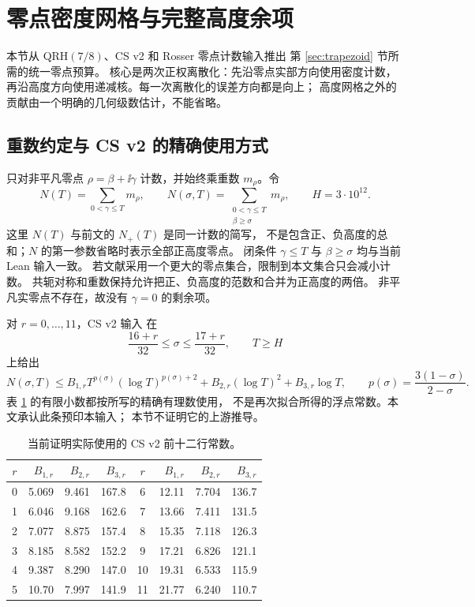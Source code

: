 \section{零点密度网格与完整高度余项}\label{sec:density}

本节从 QRH$(7/8)$、CS v2 和 Rosser 零点计数输入推出
第 \ref{sec:trapezoid} 节所需的统一零点预算。
核心是两次正权离散化：先沿零点实部方向使用密度计数，
再沿高度方向使用递减核。每一次离散化的误差方向都是向上；
高度网格之外的贡献由一个明确的几何级数估计，不能省略。

\subsection{重数约定与 CS v2 的精确使用方式}

只对非平凡零点 $\rho=\beta+\ii\gamma$ 计数，并始终乘重数
$m_\rho$。令
\[
 N(T)=\sum_{0<\gamma\leq T}m_\rho,\qquad
 N(\sigma,T)=\sum_{\substack{0<\gamma\leq T\\\beta\geq\sigma}}m_\rho,
 \qquad H=3\cdot10^{12}.
\]
这里 $N(T)$ 与前文的 $N_+(T)$ 是同一计数的简写，
不是包含正、负高度的总和；$N$ 的第一参数省略时表示全部正高度零点。
闭条件 $\gamma\leq T$ 与 $\beta\geq\sigma$ 均与当前 Lean 输入一致。
若文献采用一个更大的零点集合，限制到本文集合只会减小计数。
共轭对称和重数保持允许把正、负高度的范数和合并为正高度的两倍。
非平凡实零点不存在，故没有 $\gamma=0$ 的剩余项。

对 $r=0,\ldots,11$，CS v2 输入 \cite{CSv2} 在
\[
 \frac{16+r}{32}\leq\sigma\leq\frac{17+r}{32},\qquad T\geq H
\]
上给出
\begin{equation}\label{dens:CS}
 N(\sigma,T)\leq
 B_{1,r}T^{p(\sigma)}(\log T)^{p(\sigma)+2}
 +B_{2,r}(\log T)^2+B_{3,r}\log T,
 \qquad p(\sigma)=\frac{3(1-\sigma)}{2-\sigma}.
\end{equation}
表 \ref{dens:constants} 的有限小数都按所写的精确有理数使用，
不是再次拟合所得的浮点常数。本文承认此条预印本输入；
本节不证明它的上游推导。

\begin{table}[htbp]
\centering
\caption{当前证明实际使用的 CS v2 前十二行常数。}\label{dens:constants}
\begin{tabular}{c|rrr@{\qquad}c|rrr}
$r$&$B_{1,r}$&$B_{2,r}$&$B_{3,r}$
 &$r$&$B_{1,r}$&$B_{2,r}$&$B_{3,r}$\\ \hline
0&5.069&9.461&167.8&6&12.11&7.704&136.7\\
1&6.046&9.168&162.6&7&13.66&7.411&131.5\\
2&7.077&8.875&157.4&8&15.35&7.118&126.3\\
3&8.185&8.582&152.2&9&17.21&6.826&121.1\\
4&9.387&8.290&147.0&10&19.31&6.533&115.9\\
5&10.70&7.997&141.9&11&21.77&6.240&110.7
\end{tabular}
\end{table}

